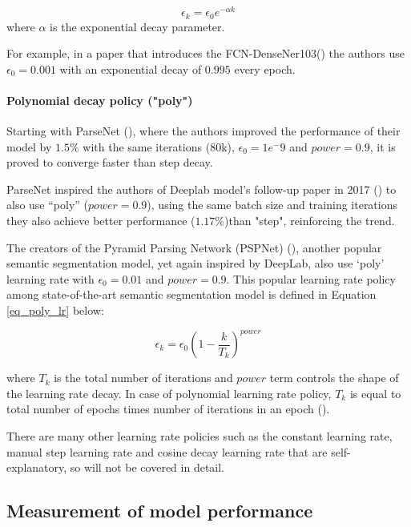 \begin{equation} \label{eq_exp_lr}
\epsilon_k = \epsilon_0e^{-\alpha k}
\end{equation} 
where $\alpha$ is the exponential decay parameter.

For example, in a paper that introduces the \gls{FCN}-DenseNer103(\cite{Jegou_2017_CVPR_Workshops}) the authors use $\epsilon_0=0.001$ with an exponential decay of $0.995$ every epoch.
\paragraph{Polynomial decay policy ("poly")} 

Starting with ParseNet (\cite{liu2015parsenet}), where the authors improved the performance of their model by $1.5\%$ with the same iterations (80k), $\epsilon_0= 1e^-9 $ and  $power=0.9$, it is proved to converge faster than step decay. 

ParseNet inspired the authors of Deeplab model's follow-up paper in 2017 (\cite{chen2017deeplab}) to also use “poly” ($power=0.9$), using the same batch size and training iterations they also achieve better performance ($1.17\%$)than "step", reinforcing the trend. 

The creators of the Pyramid Parsing Network (PSPNet) (\cite{zhao2017pyramid}), another popular semantic segmentation model, yet again inspired by DeepLab, also use ‘poly’ learning rate with $\epsilon_0= 0.01$ and $power=0.9$. This popular learning rate policy among state-of-the-art semantic segmentation model is defined in Equation \ref{eq_poly_lr} below:

\begin{equation} \label{eq_poly_lr}
\epsilon_k=\epsilon_0(1- \frac{k}{T_{k}})^{power} 
\end{equation}

where $T_{k}$ is the total number of iterations and $power$ term controls the shape of the learning rate decay. In case of polynomial learning rate policy, $T_{k}$ is equal to total number of epochs times number of iterations in an epoch (\cite{8929465}).

There are many other learning rate policies such as the constant learning rate, manual step learning rate and cosine decay learning rate that are self-explanatory, so will not be covered in detail.
\subsection{Measurement of model performance} \label{performance_measures}
